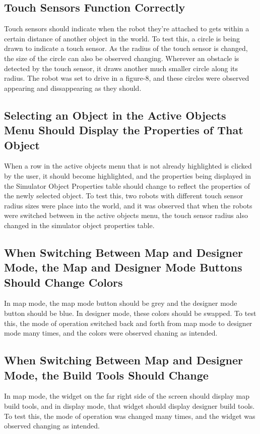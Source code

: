\subsection{Touch Sensors Function Correctly}
Touch sensors should indicate when the robot they're attached to gets within a certain distance of another object in the world. To test this, a circle is being drawn to indicate a touch sensor. As the radius of the touch sensor is changed, the size of the circle can also be observed changing. Wherever an obstacle is detected by the touch sensor, it draws another much smaller circle along its radius. The robot was set to drive in a figure-8, and these circles were observed appearing and dissappearing as they should.

\subsection{Selecting an Object in the Active Objects Menu Should Display the Properties of That Object}
When a row in the active objects menu that is not already highlighted is clicked by the user, it should become highlighted, and the properties being displayed in the Simulator Object Properties table should change to reflect the properties of the newly selected object. To test this, two robots with different touch sensor radius sizes were place into the world, and it was observed that when the robots were switched between in the active objects menu, the touch sensor radius also changed in the simulator object properties table.

\subsection{When Switching Between Map and Designer Mode, the Map and Designer Mode Buttons Should Change Colors}
In map mode, the map mode button should be grey and the designer mode button should be blue. In designer mode, these colors should be swapped. To test this, the mode of operation switched back and forth from map mode to designer mode many times, and the colors were observed chaning as intended.

\subsection{When Switching Between Map and Designer Mode, the Build Tools Should Change}
In map mode, the widget on the far right side of the screen should display map build tools, and in display mode, that widget should display designer build tools. To test this, the mode of operation was changed many times, and the widget was observed changing as intended.

